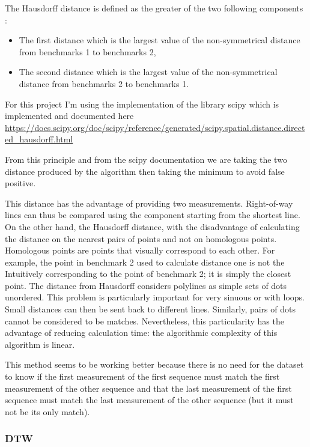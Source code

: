 \documentclass{article}
\begin{document}
The Hausdorff distance is defined as the greater of the two following components :

\begin{itemize}
    \item The first distance which is the largest value of the non-symmetrical distance from benchmarks 1 to benchmarks 2,
    \item The second distance which is the largest value of the non-symmetrical distance from benchmarks 2 to benchmarks 1.
\end{itemize}


For this project I'm using the implementation of the library scipy which is implemented and documented here \url{https://docs.scipy.org/doc/scipy/reference/generated/scipy.spatial.distance.directed_hausdorff.html}

From this principle and from the scipy documentation we are taking the two distance produced by the algorithm then taking the minimum to avoid false positive.

This distance has the advantage of providing two measurements. Right-of-way lines can thus be compared using the component starting from the shortest line. On the other hand, the Hausdorff distance, with the disadvantage of calculating the
distance on the nearest pairs of points and not on homologous points. Homologous points are points that visually correspond to each other. For example, the point in benchmark 2 used to calculate distance one is not the Intuitively corresponding to the point of benchmark 2; it is simply the closest point. The distance from Hausdorff considers polylines as simple sets of dots unordered. This problem is particularly important for very sinuous or with loops. Small distances can then be sent back to different lines. Similarly, pairs of dots cannot be considered to be matches. Nevertheless, this particularity has the advantage of reducing calculation time: the algorithmic complexity of this algorithm is linear. 


This method seems to be working better because there is no need for the dataset to know if the first measurement of the first sequence must match the first measurement of the other sequence and that the last measurement of the first sequence must match the last measurement of the other sequence (but it must not be its only match).


\subsubsection{DTW}
\end{document}
